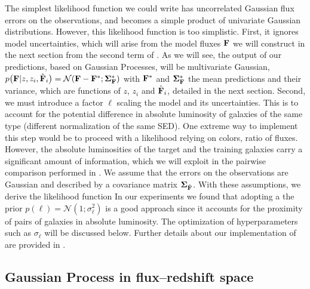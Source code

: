 \documentclass[aps,prd,showpacs,superscriptaddress,groupedaddress]{revtex4}  %
\begin{document}
The simplest likelihood function we could write has uncorrelated Gaussian flux errors on the observations, and becomes a simple product of univariate Gaussian distributions.
However, this likelihood function is too simplistic.
First, it ignores model uncertainties, which will arise from the model fluxes $\mat{F}$ we will construct in the next section from the second term of .
As we will see, the output of our predictions, based on Gaussian Processes, will be multivariate Gaussian, \ie $p\bigl( \mat{F}| z, z_i, \hat{\mat{F}}_i\bigr) = \mathcal{N}(\mat{F}- \mat{F}^*;\mat{\Sigma}^*_\mat{F})$ with $\mat{F}^*$ and $\mat{\Sigma}^*_\mat{F}$ the mean predictions and their variance, which are functions of $z$, $z_i$ and $\hat{\mat{F}}_i$, detailed in the next section.
Second, we must introduce a factor $\ell$ scaling the model and its uncertainties. 
This is to account for the potential difference in absolute luminosity of galaxies of the same type (\ie different normalization of the same SED).
One extreme way to implement this step would be to proceed with a likelihood relying on colors, \ie ratio of fluxes.
However, the absolute luminosities of the target and the training galaxies carry a significant amount of information, which we will exploit in the pairwise comparison performed in .
We assume that the errors on the observations are Gaussian and described by a covariance matrix $\mat{\Sigma}_{\hat{\mat{F}}}$. 
With these assumptions, we derive the likelihood function 
In our experiments we found that adopting a the prior $p(\ell ) =  \mathcal{N}(1; \sigma^2_\ell)$ is a good approach since it accounts for the proximity of pairs of galaxies in absolute luminosity.
The optimization of hyperparameters such as $\sigma_\ell$ will be discussed below. 
Further details about our implementation of  are provided in .

	
\subsection{Gaussian Process in flux--redshift space}\label{sec:gppres}
\end{document}

